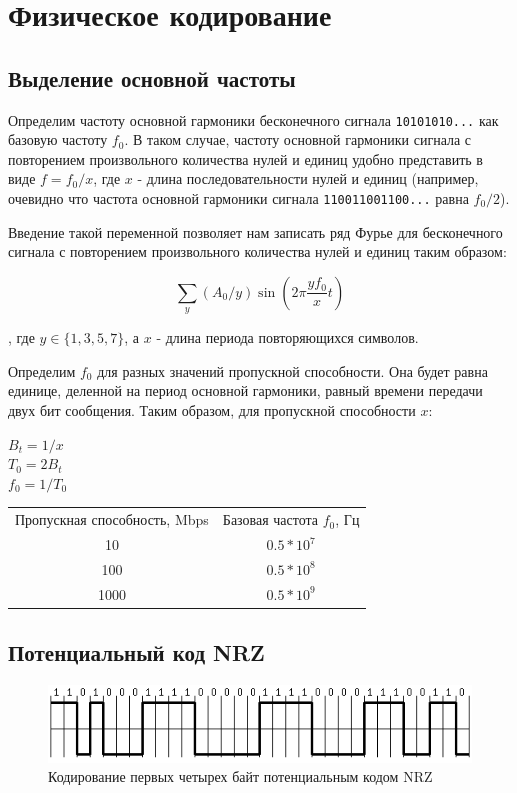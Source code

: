 \documentclass[12pt, a4paper]{article}
\begin{document}
\section{Физическое кодирование}

\subsection{Выделение основной частоты}

Определим частоту основной гармоники бесконечного сигнала \texttt{10101010...}
как базовую частоту $f_0$. В таком случае, частоту основной гармоники сигнала
с повторением произвольного количества нулей и единиц удобно представить в
виде $f = f_0 / x$, где $x$ - длина последовательности нулей и единиц (например,
очевидно что частота основной гармоники сигнала \texttt{110011001100...} равна
$f_0 / 2$).

Введение такой переменной позволяет нам записать ряд Фурье для бесконечного
сигнала с повторением произвольного количества нулей и единиц таким образом:

$$\sum_y (A_0 / y) \sin (2 \pi \frac{y f_0}{x} t)$$

, где $y \in \{ 1, 3, 5, 7 \}$, а $x$ - длина периода повторяющихся символов.

Определим $f_0$ для разных значений пропускной способности. Она будет равна
единице, деленной на период основной гармоники, равный времени передачи двух
бит сообщения. Таким образом, для пропускной способности $x$:

\newpage

\noindent $B_t = 1 / x$ \\
$T_0 = 2 B_t$ \\
$f_0 = 1 / T_0$ \\

\begin{tabular}{ c | c }
  Пропускная способность, Mbps & Базовая частота $f_0$, Гц \\
  10 & $0.5 * 10^7$ \\
  100 & $0.5 * 10^8$ \\
  1000 & $0.5 * 10^9$
\end{tabular}

\subsection{Потенциальный код NRZ}

\begin{figure}[h]
  \begin{center}
    \includegraphics{nrz}
    \caption{Кодирование первых четырех байт потенциальным кодом NRZ}
    \label{fig:nrz}
  \end{center}
\end{figure}
\end{document}
